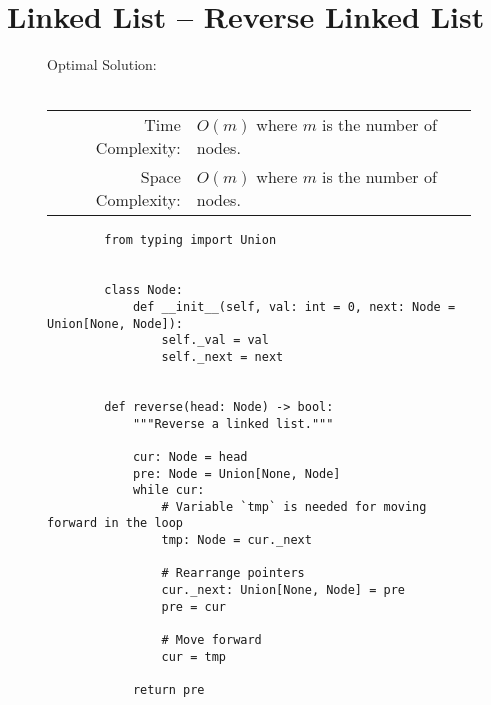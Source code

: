 
\section{Linked List -- Reverse Linked List}

\begin{figure}[H]
    Optimal Solution:\\\\
    \begin{tabular}{rl}
        Time Complexity:& \(O(m)\) where \(m\) is the number of nodes.\\
        Space Complexity:& \(O(m)\) where \(m\) is the number of nodes.
    \end{tabular}
\end{figure}

\begin{figure}[H]
    \centering
    \begin{verbatim}
        from typing import Union


        class Node:
            def __init__(self, val: int = 0, next: Node = Union[None, Node]):
                self._val = val
                self._next = next


        def reverse(head: Node) -> bool:
            """Reverse a linked list."""

            cur: Node = head
            pre: Node = Union[None, Node]
            while cur:
                # Variable `tmp` is needed for moving forward in the loop
                tmp: Node = cur._next

                # Rearrange pointers
                cur._next: Union[None, Node] = pre
                pre = cur

                # Move forward
                cur = tmp

            return pre
    \end{verbatim}
\end{figure}
